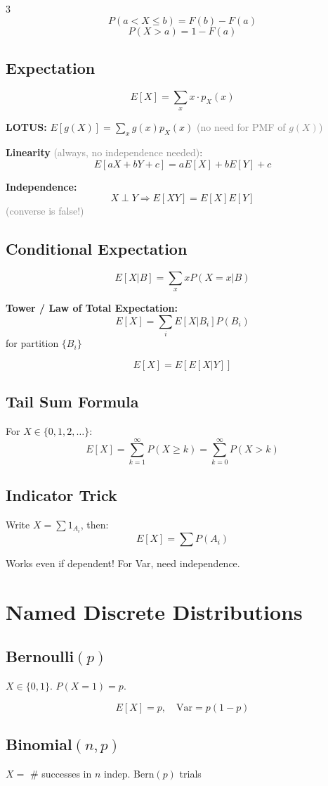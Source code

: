 \documentclass[10pt,landscape]{article}
\newcommand{\note}[1]{\textcolor{gray}{\small(#1)}}
\begin{document}
\begin{multicols}{3}
$$P(a < X \leq b) = F(b) - F(a)$$
$$P(X > a) = 1 - F(a)$$

\subsection{Expectation}
$$E[X] = \sum_x x \cdot p_X(x)$$

\textbf{LOTUS:} $E[g(X)] = \sum_x g(x) p_X(x)$
\note{no need for PMF of $g(X)$}

\textbf{Linearity} \note{always, no independence needed}:
$$E[aX + bY + c] = aE[X] + bE[Y] + c$$

\textbf{Independence:}
$$X \perp Y \Rightarrow E[XY] = E[X]E[Y]$$
\note{converse is false!}

\subsection{Conditional Expectation}
$$E[X | B] = \sum_x x P(X = x | B)$$

\textbf{Tower / Law of Total Expectation:}
$$E[X] = \sum_i E[X | B_i] P(B_i)$$
for partition $\{B_i\}$

$$E[X] = E[E[X | Y]]$$

\subsection{Tail Sum Formula}
For $X \in \{0, 1, 2, \ldots\}$:
$$E[X] = \sum_{k=1}^\infty P(X \geq k) = \sum_{k=0}^\infty P(X > k)$$

\subsection{Indicator Trick}
Write $X = \sum 1_{A_i}$, then:
$$E[X] = \sum P(A_i)$$

Works even if dependent! For Var, need independence.

\section{Named Discrete Distributions}

\subsection{Bernoulli$(p)$}
$X \in \{0, 1\}$. $P(X = 1) = p$.

$$E[X] = p, \quad \text{Var} = p(1-p)$$

\subsection{Binomial$(n, p)$}
$X = $ \# successes in $n$ indep. Bern$(p)$ trials


\end{multicols}
\end{document}
